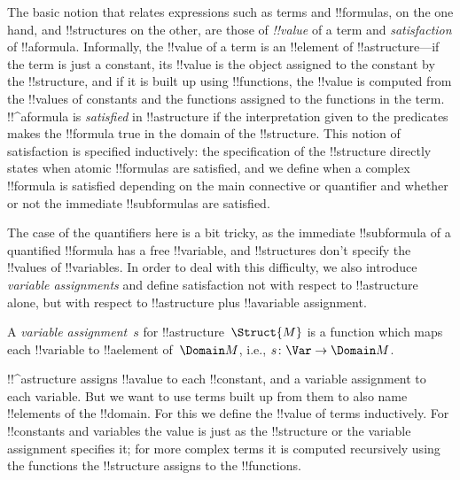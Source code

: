 \documentclass[../../../include/open-logic-section]{subfiles}
\begin{document}

\begin{explain}
The basic notion that relates expressions such as terms and
!!{formula}s, on the one hand, and !!{structure}s on the other, are
those of \emph{!!{value}} of a term and \emph{satisfaction} of 
!!a{formula}.  Informally, the !!{value} of a term is an !!{element} of
!!a{structure}---if the term is just a constant, its !!{value} is the
object assigned to the constant by the !!{structure}, and if it is
built up using !!{function}s, the !!{value} is computed from the
!!{value}s of constants and the functions assigned to the functions in
the term.  !!^a{formula} is \emph{satisfied} in !!a{structure} if the
interpretation given to the predicates makes the !!{formula} true in
the domain of the !!{structure}. This notion of satisfaction is
specified inductively: the specification of the !!{structure} directly
states when atomic !!{formula}s are satisfied, and we define when a
complex !!{formula} is satisfied depending on the main connective or
quantifier and whether or not the immediate !!{subformula}s are
satisfied. 

The case of the quantifiers here is a bit tricky, as the
immediate !!{subformula} of a quantified !!{formula} has a free
!!{variable}, and !!{structure}s don't specify the !!{value}s of
!!{variable}s.  In order to deal with this difficulty, we also
introduce \emph{variable assignments} and define satisfaction not with
respect to !!a{structure} alone, but with respect to !!a{structure}
plus !!a{variable} assignment.
\end{explain}

\begin{defn}
A \emph{variable assignment}~$s$ for !!a{structure}~$\Struct{M}$ is a
function which maps each !!{variable} to !!a{element} of~$\Domain M$,
i.e., $s\colon \Var \to \Domain M$.
\end{defn}

\begin{explain}
!!^a{structure} assigns !!a{value} to each !!{constant}, and a
variable assignment to each variable.  But we want to use terms built
up from them to also name !!{element}s of the !!{domain}.  For this we
define the !!{value} of terms inductively. For !!{constant}s and
variables the value is just as the !!{structure} or the variable
assignment specifies it; for more complex terms it is computed
recursively using the functions the !!{structure} assigns to the
!!{function}s.
\end{explain}
\end{document}
